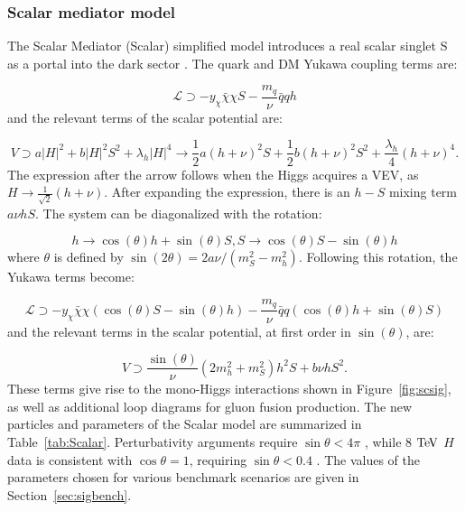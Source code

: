 \subsubsection{Scalar mediator model}

The Scalar Mediator (Scalar) simplified model introduces a real scalar singlet S as a portal into the dark sector \cite{MarchRussell:2008yu}. The quark and DM Yukawa coupling terms are:

\begin{equation}
\mathcal{L} \supset -y_\chi \bar{\chi} \chi S - \frac{m_q}{\nu} \bar{q} q h
\end{equation}
and the relevant terms of the scalar potential are:

\begin{equation}
V \supset a |H|^2 + b |H|^2 S^2 + \lambda_h |H|^4 \rightarrow \frac{1}{2} a (h+\nu)^2 S + \frac{1}{2} b (h+\nu)^2 S^2 + \frac{\lambda_h}{4}(h+\nu)^4.
\end{equation}
The expression after the arrow follows when the Higgs acquires a VEV, as $H \rightarrow \frac{1}{\sqrt{2}} (h + \nu)$. After expanding the expression, there is an $h-S$ mixing term $a\nu hS$. The system can be diagonalized with the rotation:

\begin{equation}
h \rightarrow \cos(\theta) h + \sin(\theta) S, S \rightarrow \cos(\theta) S - \sin(\theta) h
\end{equation}
where $\theta$ is defined by $\sin(2\theta) = 2a\nu/(m_S^2-m_h^2)$. Following this rotation, the Yukawa terms become:

\begin{equation}
\mathcal{L} \supset -y_\chi \bar{\chi} \chi (\cos(\theta) S - \sin(\theta) h) - \frac{m_q}{\nu} \bar{q} q (\cos(\theta) h + \sin(\theta) S)
\end{equation}
and the relevant terms in the scalar potential, at first order in $\sin(\theta)$, are:

\begin{equation}
V \supset \frac{\sin(\theta)}{\nu}(2m_h^2 + m_S^2) h^2 S + b \nu h S^2.
\end{equation}
These terms give rise to the mono-Higgs interactions shown in Figure~\ref{fig:scsig}, as well as additional loop diagrams for gluon fusion production. The new particles and parameters of the Scalar model are summarized in Table~\ref{tab:Scalar}. Perturbativity arguments require $\sin\theta<4\pi$ \cite{Carpenter:2013xra}, while 8 $\mathrm{Te\kern -0.1em V}$ $H$ data is consistent with $\cos\theta=1$, requiring $\sin\theta<0.4$ \cite{Falkowski:2013dza, Djouadi:2013qya, Giardino:2013bma, Ellis:2013lra}. The values of the parameters chosen for various benchmark scenarios are given in Section~\ref{sec:sigbench}.

